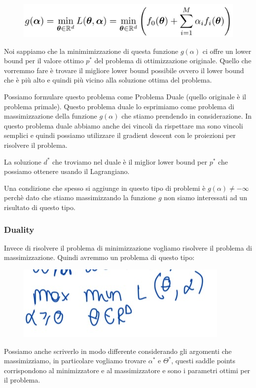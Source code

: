 \documentclass[14pt]{extreport}
\begin{document}
\begin{figure}[H]
	\centering
	\includegraphics[width=0.7\linewidth]{303.jpeg}
\end{figure}

Noi sappiamo che la minimimizzazione di questa funzione $g(\alpha)$ ci offre un lower bound per il valore ottimo $p^*$ del problema di ottimizzazione
originale. Quello che vorremmo fare è trovare il migliore lower bound possibile ovvero il lower bound che è più alto e quindi più vicino alla
soluzione ottima del problema.

Possiamo formulare questo problema come Problema Duale (quello originale è il problema primale). Questo problema duale lo esprimiamo come problema di
massimizzazione della funzione $g(\alpha)$ che stiamo prendendo in considerazione. In questo problema duale abbiamo anche dei vincoli da rispettare ma
sono vincoli semplici e quindi possiamo utilizzare il gradient descent con le proiezioni per risolvere il problema.

La soluzione $d^*$ che troviamo nel duale è il miglior lower bound per $p^*$ che possiamo ottenere usando il Lagrangiano.

Una condizione che spesso si aggiunge in questo tipo di problemi è $g(\alpha) \neq -\infty$ perchè dato che stiamo massimizzando la funzione $g$ non
siamo interessati ad un risultato di questo tipo.

\subsubsection{Duality}

Invece di risolvere il problema di minimizzazione vogliamo risolvere il problema di massimizzazione. Quindi avremmo un problema di questo tipo:

\begin{figure}[H]
	\centering
	\includegraphics[width=0.3\linewidth]{309.jpeg}
\end{figure}

Possiamo anche scriverlo in modo differente considerando gli argomenti che massimizziamo, in particolare vogliamo trovare $\alpha^*$ e $\Theta^*$,
questi saddle points corrispondono al minimizzatore e al massimizzatore e sono i parametri ottimi per il problema.
\end{document}
